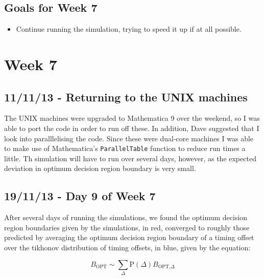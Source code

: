 \subsection{Goals for Week 7}

\begin{itemize}
\itemsep1pt\parskip0pt
\item
  Continue running the simulation, trying to speed it up if at all
  possible.
\end{itemize}

\section{Week 7}

\subsection{11/11/13 - Returning to the UNIX machines}

The UNIX machines were upgraded to Mathematica 9 over the weekend, so I
was able to port the code in order to run off these. In addition, Dave
suggested that I look into paralllelising the code. Since these were
dual-core machines I was able to make use of Mathematica's
\texttt{ParallelTable} function to reduce run times a little. Th
simulation will have to run over several days, however, as the expected
deviation in optimum decision region boundary is very small.

\subsection{19/11/13 - Day 9 of Week 7}

After several days of running the simulations, we found the optimum
decision region boundaries given by the simulations, in red, converged
to roughly those predicted by averaging the optimum decision region
boundary of a timing offset over the tikhonov distribution of timing
offsets, in blue, given by the equation:

\[
B_{\text{OPT}} \sim \sum_{\Delta} \text{P}(\Delta) B_{\text{OPT,}\Delta}
\]

